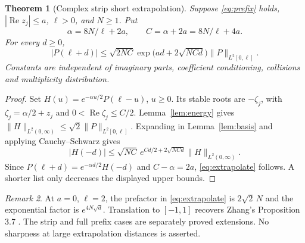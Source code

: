 \documentclass[11pt]{article}
\newtheorem{theorem}{Theorem}[section]
\theoremstyle{remark}
\newtheorem{remark}[theorem]{Remark}
\newcommand{\norm}[1]{\lVert #1\rVert}
\newcommand{\Rea}{\operatorname{Re}}
\begin{document}
\begin{theorem}[Complex strip short extrapolation]\label{thm:extrapolate}
Suppose \eqref{eq:prefix} holds, $|\Rea z_j|\le a$, $\ell>0$, and
$N\ge1$. Put
\begin{equation}\label{eq:C}
 \alpha=8N/\ell+2a,\qquad C=\alpha+2a=8N/\ell+4a.
\end{equation}
For every $d\ge0$,
\begin{equation}\label{eq:extrapolate}
 |P(\ell+d)|\le\sqrt{2NC}
     \exp\bigl(ad+2\sqrt{NCd}\bigr)\norm P_{L^2[0,\ell]}.
\end{equation}
Constants are independent of imaginary parts, coefficient conditioning,
collisions and multiplicity distribution.
\end{theorem}
\begin{proof}
Set $H(u)=e^{-\alpha u/2}P(\ell-u)$, $u\ge0$.
Its stable roots are $-\zeta_j$, with
$\zeta_j=\alpha/2+z_j$ and $0<\Rea\zeta_j\le C/2$.
Lemma~\ref{lem:energy} gives
$\norm H_{L^2(0,\infty)}\le\sqrt2\norm P_{L^2[0,\ell]}$.
Expanding in Lemma~\ref{lem:basis} and applying Cauchy--Schwarz gives
\[
 |H(-d)|\le\sqrt{NC}\,e^{Cd/2+2\sqrt{NCd}}
                                      \norm H_{L^2(0,\infty)}.
\]
Since $P(\ell+d)=e^{-\alpha d/2}H(-d)$ and $C-\alpha=2a$,
\eqref{eq:extrapolate} follows. A shorter list only decreases the
displayed upper bounds.
\end{proof}
\begin{remark}\label{rem:zhang}
At $a=0$, $\ell=2$, the prefactor in \eqref{eq:extrapolate} is
$2\sqrt2\,N$ and the exponential factor is $e^{4N\sqrt d}$.
Translation to $[-1,1]$ recovers Zhang's Proposition 3.7 \cite{Zhang}.
The strip and full prefix cases are separately proved extensions.
No sharpness at large extrapolation distances is asserted.
\end{remark}
\end{document}
